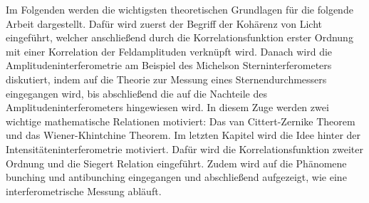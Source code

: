 Im Folgenden werden die wichtigsten theoretischen Grundlagen für die folgende Arbeit dargestellt. 
Dafür wird zuerst der Begriff der Kohärenz von Licht eingeführt, welcher anschließend durch die Korrelationsfunktion erster Ordnung mit einer Korrelation der Feldamplituden verknüpft wird. 
Danach wird die Amplitudeninterferometrie am Beispiel des Michelson Sterninterferometers diskutiert, indem auf die Theorie zur Messung eines Sternendurchmessers eingegangen wird, bis abschließend die auf die Nachteile des Amplitudeninterferometers hingewiesen wird. 
In diesem Zuge werden zwei wichtige mathematische Relationen motiviert: Das van Cittert-Zernike Theorem und das Wiener-Khintchine Theorem. 
Im letzten Kapitel wird die Idee hinter der Intensitäteninterferometrie motiviert. 
Dafür wird die Korrelationsfunktion zweiter Ordnung und die Siegert Relation eingeführt. 
Zudem wird auf die Phänomene bunching und antibunching eingegangen und abschließend aufgezeigt, wie eine interferometrische Messung abläuft.  


